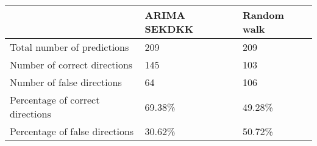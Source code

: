 \begin{tabular}{lll}
\hline
                                  & ARIMA SEKDKK   & Random walk   \\
\hline
 Total number of predictions      & 209            & 209           \\
 Number of correct directions     & 145            & 103           \\
 Number of false directions       & 64             & 106           \\
 Percentage of correct directions & 69.38\%         & 49.28\%        \\
 Percentage of false directions   & 30.62\%         & 50.72\%        \\
\hline
\end{tabular}